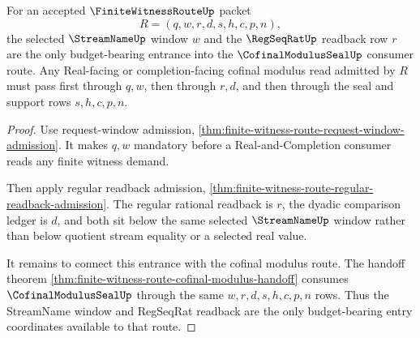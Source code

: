 \begin{theorem}
\label{thm:finite-witness-route-stream-regseq-budget-factorization}
For an accepted $\FiniteWitnessRouteUp$ packet
$$
R=(q,w,r,d,s,h,c,p,n),
$$
the selected $\StreamNameUp$ window $w$ and the $\RegSeqRatUp$ readback row $r$ are the only budget-bearing entrance into the $\CofinalModulusSealUp$ consumer route. Any Real-facing or completion-facing cofinal modulus read admitted by $R$ must pass first through $q,w$, then through $r,d$, and then through the seal and support rows $s,h,c,p,n$.
\end{theorem}
\begin{proof}
Use request-window admission, \autoref{thm:finite-witness-route-request-window-admission}. It makes $q,w$ mandatory before a Real-and-Completion consumer reads any finite witness demand.

Then apply regular readback admission, \autoref{thm:finite-witness-route-regular-readback-admission}. The regular rational readback is $r$, the dyadic comparison ledger is $d$, and both sit below the same selected $\StreamNameUp$ window rather than below quotient stream equality or a selected real value.

It remains to connect this entrance with the cofinal modulus route. The handoff theorem \autoref{thm:finite-witness-route-cofinal-modulus-handoff} consumes $\CofinalModulusSealUp$ through the same $w,r,d,s,h,c,p,n$ rows. Thus the StreamName window and RegSeqRat readback are the only budget-bearing entry coordinates available to that route.
\end{proof}

